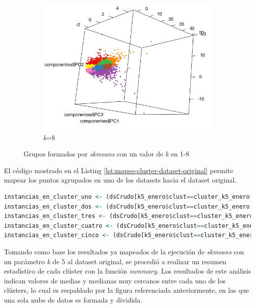 \documentclass[12pt]{article}
\numberwithin{equation}{section}
\numberwithin{table}{section}
\numberwithin{figure}{section}
\begin{document}
\begin{figure}
\begin{subfigure}[b]{0.33\textwidth}
                \includegraphics[width=1\textwidth]{imagenes/k8}
                \caption{\emph{k}=8}
        \end{subfigure}
        \caption{Grupos formados por \emph{skmeans} con un valor de \emph{k} en 1-8}
        \label{fig:ejecucion-skmeans}
\end{figure}

El código mostrado en el Listing \ref{lst:mapeo-cluster-dataset-original} permite mapear los puntos agrupados en uno de los datasets hacia el dataset original. 

\begin{lstlisting}[language=R, caption=Mapeo de elementos ubicados en un cluster al dataset original, label={lst:mapeo-cluster-dataset-original},]
instancias_en_cluster_uno <- (dsCrudo[k5_enero$clust==cluster_k5_enero[1],])
instancias_en_cluster_dos <- (dsCrudo[k5_enero$clust==cluster_k5_enero[2],])
instancias_en_cluster_tres <- (dsCrudo[k5_enero$clust==cluster_k5_enero[3],])
instancias_en_cluster_cuatro <- (dsCrudo[k5_enero$clust==cluster_k5_enero[4],])
instancias_en_cluster_cinco <- (dsCrudo[k5_enero$clust==cluster_k5_enero[5],])
\end{lstlisting}


Tomando como base los resultados ya mapeados de la ejecución de \emph{skmeans} con un parámetro \emph{k} de 5 al dataset original, se procedió a realizar un resumen estadístico de cada clúster con la función \emph{summary}.
Los resultados de este análisis indican valores de medias y medianas muy cercanos entre cada uno de los clústers, lo cual es respaldado por la figura referenciada anteriormente, en las que una sola nube de datos es formada y dividida.
\end{document}
